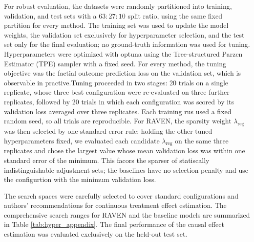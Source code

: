 \documentclass[twoside]{article}
\theoremstyle{plain}
\theoremstyle{definition}
\theoremstyle{remark}
\newtheorem{proof sketch}[theorem]{Proof Sketch}
\begin{document}
For robust evaluation, the datasets were randomly partitioned into training, validation, and test sets with a $63{:}27{:}10$ split ratio, using the same fixed partition for every method. The training set was used to update the model weights, the validation set exclusively for hyperparameter selection, and the test set only for the final evaluation; no ground-truth information was used for tuning. Hyperparameters were optimized with optuna using the Tree-structured Parzen Estimator (TPE) sampler with a fixed seed. For every method, the tuning objective was the factial outcome prediction loss on the validation set, which is observable in practive.Tuning proceeded in two stages: 20 trials on a single replicate, whose three best configuration were re-evaluated on three further replicates, followed by 20 trials in which each configuration was scored by its validation loss averaged over three replicates. Each training rus used a fixed random seed, so all trials are reproducible. For RAVEN, the sparsity weight $\lambda_{\mathrm{reg}}$ was then selected by one-standard error rule\citep{breiman1984classification}: holding the other tuned hyperparameters fixed, we evaluated each candidate $\lambda_{\mathrm{reg}}$ on the same three replicates and chose the largest value whose mean validation loss was within one standard error of the minimum. This facors the sparser of statiscally indistinguishable adjustment sets; the baselines have no selection penalty and use the configurtion with the minimum validation loss.

The search spaces were carefully selected to cover standard configurations and authors' recommendations for continuous treatment effect estimation. The comprehensive search ranges for RAVEN and the baseline models are summarized in Table \ref{tab:hyper_appendix}. The final performance of the causal effect estimation was evaluated exclusively on the held-out test set.
\end{document}
